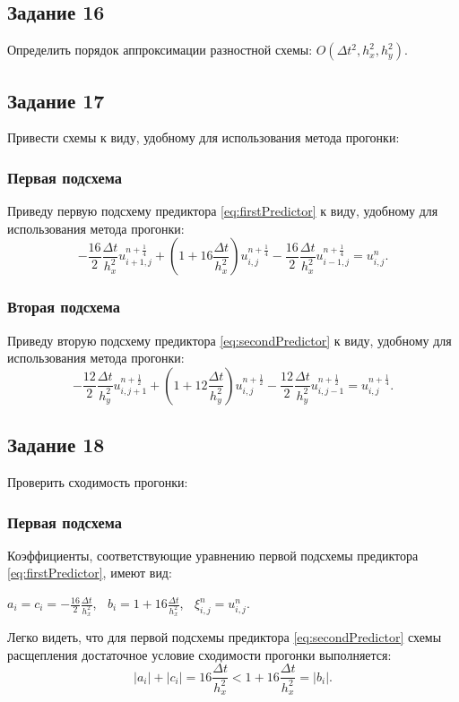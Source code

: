 \documentclass[12pt, a4paper]{report}
\begin{document}
	\subsection*{Задание 16}
	\large
	Определить порядок аппроксимации разностной схемы: $O(\Delta t^{2}, h_{x}^{2}, h_{y}^{2})$.

	\subsection*{Задание 17}
	\large
	Привести схемы к виду, удобному для использования метода прогонки:
	\subsubsection*{Первая подсхема}
	\large
	Приведу первую подсхему предиктора \eqref{eq:firstPredictor} к виду, удобному для использования метода прогонки:
	\small
	\begin{equation*}
		-\frac{16}{2}\frac{\Delta t}{h_{x}^{2}}u_{i+1, j}^{n+\frac{1}{4}} + (1 + 16\frac{\Delta t}{h_{x}^{2}})u_{i, j}^{n+\frac{1}{4}} - \frac{16}{2}\frac{\Delta t}{h_{x}^{2}}u_{i-1, j}^{n+\frac{1}{4}} = u_{i, j}^{n}.
	\end{equation*}
	\subsubsection*{Вторая подсхема}
	\large
	Приведу вторую подсхему предиктора \eqref{eq:secondPredictor} к виду, удобному для использования метода прогонки:
	\small
	\begin{equation*}
		-\frac{12}{2}\frac{\Delta t}{h_{y}^{2}}u_{i, j+1}^{n+\frac{1}{2}} + (1 + 12\frac{\Delta t}{h_{y}^{2}})u_{i, j}^{n+\frac{1}{2}} - \frac{12}{2}\frac{\Delta t}{h_{y}^{2}}u_{i, j-1}^{n+\frac{1}{2}} = u_{i, j}^{n+\frac{1}{4}}.
	\end{equation*}

	\subsection*{Задание 18}
	\large
	Проверить сходимость прогонки:
	\subsubsection*{Первая подсхема}
	\large
	Коэффициенты, соответствующие уравнению первой подсхемы предиктора \eqref{eq:firstPredictor}, имеют вид:
	\small
	\begin{center}
		$a_{i}=c_{i}=-\frac{16}{2}\frac{\Delta t}{h_{x}^{2}}$, $\>$ $b_{i}=1 + 16\frac{\Delta t}{h_{x}^{2}}$, $\>$ $\xi_{i, j}^{n}=u_{i, j}^{n}$.
	\end{center}
	\par
	\large
	Легко видеть, что для первой подсхемы предиктора \eqref{eq:secondPredictor} схемы расщепления достаточное условие сходимости прогонки выполняется:
	\begin{equation*}
		\lvert a_{i} \rvert + \lvert c_{i} \rvert = 16\frac{\Delta t}{h_{x}^{2}} < 1 + 16\frac{\Delta t}{h_{x}^{2}} = \lvert b_{i} \rvert.
	\end{equation*}
\end{document}
